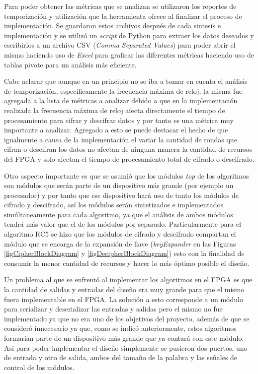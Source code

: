 Para poder obtener las métricas que se analizan se utilizaron los reportes de temporización y utilización que la herramienta ofrece al finalizar el proceso de implementación. Se guardaron estos archivos después de cada sintesís e implementación y se utilizó un \textit{script} de Python para extraer los datos deseados y escribirlos a un archivo CSV (\textit{Comma Separated Values}) para poder abrir el mismo haciendo uso de \textit{Excel} para graficar las diferentes métricas haciendo uso de tablas pivote para un análisis más eficiente.


Cabe aclarar que aunque en un principio no se iba a tomar en cuenta el análisis de temporización, específicamente la frecuencia máxima de reloj, la misma fue agregada a la lista de métricas a analizar debido a que en la implementación realizada la frecuencia máxima de reloj afecta directamente el tiempo de procesamiento para cifrar y descifrar datos y por tanto es una métrica muy importante a analizar. Agregado a esto se puede destacar el hecho de que igualmente a causa de la implementación el variar la cantidad de rondas que cifran o descifran los datos no afectan de ninguna manera la cantidad de recursos del FPGA y solo afectan el tiempo de procesamiento total de cifrado o descifrado.


Otro aspecto importante es que se asumió que los módulos \textit{top} de los algoritmos son módulos que serán parte de un dispositivo más grande (por ejemplo un procesador) y por tanto que ese dispositivo hará uso de tanto los módulos de cifrado y descifrado, así los módulos serán sintetizados e implementados simúltaneamente para cada algoritmo, ya que el análisis de ambos módulos tendrá más valor que el de los módulos por separado. Particularmente para el algoritmo RC5 se hizo que los módulos de cifrado y descifrado compartan el módulo que se encarga de la expansión de llave (\textit{keyExpander} en las Figuras \ref{figCipherBlockDiagram} y \ref{figDecipherBlockDiagram}) esto con la finalidad de consumir la menor cantidad de recursos y hacer lo más óptimo posible el diseño.


Un problema al que se enfrentó al implementar los algoritmos en el FPGA es que la cantidad de salidas y entradas del diseño era muy grande para que el mismo fuera implementable en el FPGA. La solución a esto corresponde a un módulo para serializar y deserializar las entradas y salidas pero el mismo no fue implementado ya que no era uno de los objetivos del proyecto, además de que se consideró innecesario ya que, como se indicó anteriormente, estos algoritmos formarían parte de un dispositivo más grande que ya contará con este módulo. Así para poder implementar el diseño simplemente se pusieron dos puertos, uno de entrada y otro de salida, ambos del tamaño de la palabra y las señales de control de los módulos.

